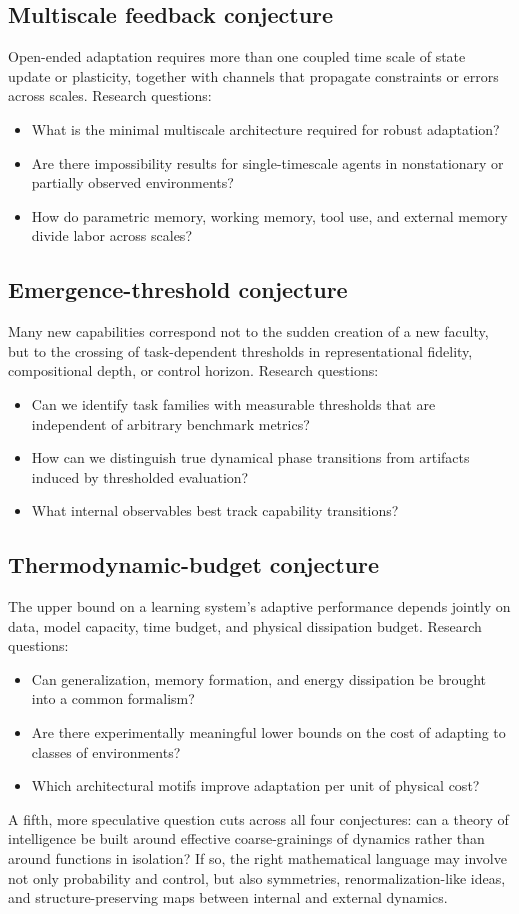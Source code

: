 \documentclass[11pt]{article}
\begin{document}
\subsection{Multiscale feedback conjecture}
Open-ended adaptation requires more than one coupled time scale of state update or plasticity, together with channels that propagate constraints or errors across scales.
Research questions:
\begin{itemize}
\item What is the minimal multiscale architecture required for robust adaptation?
\item Are there impossibility results for single-timescale agents in nonstationary or partially observed environments?
\item How do parametric memory, working memory, tool use, and external memory divide labor across scales?
\end{itemize}
\subsection{Emergence-threshold conjecture}
Many new capabilities correspond not to the sudden creation of a new faculty, but to the crossing of task-dependent thresholds in representational fidelity, compositional depth, or control horizon.
Research questions:
\begin{itemize}
\item Can we identify task families with measurable thresholds that are independent of arbitrary benchmark metrics?
\item How can we distinguish true dynamical phase transitions from artifacts induced by thresholded evaluation?
\item What internal observables best track capability transitions?
\end{itemize}
\subsection{Thermodynamic-budget conjecture}
The upper bound on a learning system's adaptive performance depends jointly on data, model capacity, time budget, and physical dissipation budget.
Research questions:
\begin{itemize}
\item Can generalization, memory formation, and energy dissipation be brought into a common formalism?
\item Are there experimentally meaningful lower bounds on the cost of adapting to classes of environments?
\item Which architectural motifs improve adaptation per unit of physical cost?
\end{itemize}
A fifth, more speculative question cuts across all four conjectures: can a theory of intelligence be built around effective coarse-grainings of dynamics rather than around functions in isolation? If so, the right mathematical language may involve not only probability and control, but also symmetries, renormalization-like ideas, and structure-preserving maps between internal and external dynamics.
\end{document}
